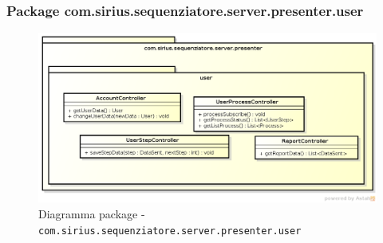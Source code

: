 \subsubsection{Package com.sirius.sequenziatore.server.presenter.user}
\begin{figure}[H] \centering \includegraphics[width=%
\textwidth]
{./classi/server/presenteruser.png} \caption{Diagramma package - \texttt{com.sirius.sequenziatore.server.presenter.user}}
\end{figure}
